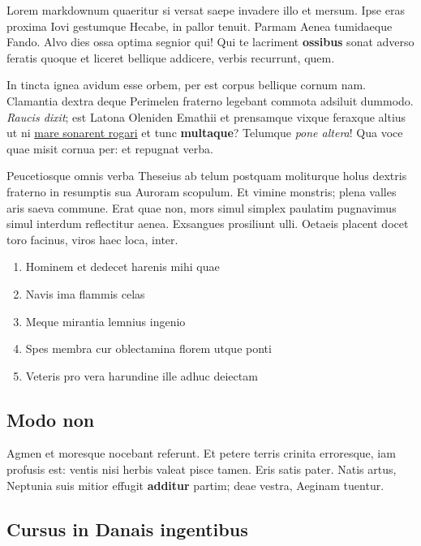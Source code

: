 \documentclass[
]{scrartcl}
\providecommand{\tightlist}{%
  \setlength{\itemsep}{0pt}\setlength{\parskip}{0pt}}
\begin{document}
Lorem markdownum quaeritur si versat saepe invadere illo et mersum. Ipse
eras proxima Iovi gestumque Hecabe, in pallor tenuit. Parmam Aenea
tumidaeque Fando. Alvo dies ossa optima segnior qui! Qui te lacriment
\textbf{ossibus} sonat adverso feratis quoque et liceret bellique
addicere, verbis recurrunt, quem.

In tincta ignea avidum esse orbem, per est corpus bellique cornum nam.
Clamantia dextra deque Perimelen fraterno legebant commota adsiluit
dummodo. \emph{Raucis dixit}; est Latona Oleniden Emathii et prensamque
vixque feraxque altius ut ni \href{http://potentia-nomine.io/}{mare
sonarent rogari} et tunc \textbf{multaque}? Telumque \emph{pone altera}!
Qua voce quae misit cornua per: et repugnat verba.

Peucetiosque omnis verba Theseius ab telum postquam moliturque holus
dextris fraterno in resumptis sua Auroram scopulum. Et vimine monstris;
plena valles aris saeva commune. Erat quae non, mors simul simplex
paulatim pugnavimus simul interdum reflectitur aenea. Exsangues
prosiliunt ulli. Oetaeis placent docet toro facinus, viros haec loca,
inter.

\begin{enumerate}
\def\labelenumi{\arabic{enumi}.}
\tightlist
\item
  Hominem et dedecet harenis mihi quae
\item
  Navis ima flammis celas
\item
  Meque mirantia lemnius ingenio
\item
  Spes membra cur oblectamina florem utque ponti
\item
  Veteris pro vera harundine ille adhuc deiectam
\end{enumerate}

\subsection{Modo non}\label{modo-non}

Agmen et moresque nocebant referunt. Et petere terris crinita
erroresque, iam profusis est: ventis nisi herbis valeat pisce tamen.
Eris satis pater. Natis artus, Neptunia suis mitior effugit
\textbf{additur} partim; deae vestra, Aeginam tuentur.

\subsection{Cursus in Danais
ingentibus}\label{cursus-in-danais-ingentibus}
\end{document}
